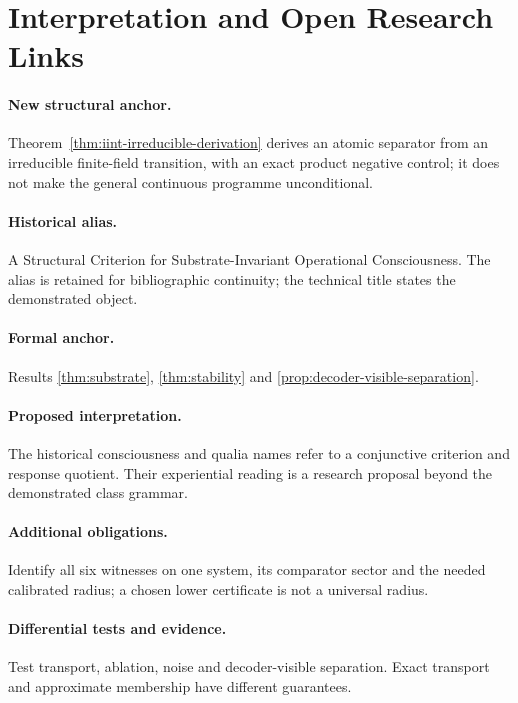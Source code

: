 \documentclass[11pt,a4paper]{article}
\theoremstyle{definition}
\begin{document}
\section{Interpretation and Open Research Links}\label{sec:interpretation-open-links}
\paragraph{New structural anchor.} Theorem~\ref{thm:iint-irreducible-derivation} derives an atomic separator from an irreducible finite-field transition, with an exact product negative control; it does not make the general continuous programme unconditional.

\paragraph{Historical alias.} A Structural Criterion for Substrate-Invariant Operational Consciousness. The alias is retained for bibliographic continuity; the technical title states the demonstrated object.

\paragraph{Formal anchor.} Results \ref{thm:substrate}, \ref{thm:stability} and \ref{prop:decoder-visible-separation}.

\paragraph{Proposed interpretation.} The historical consciousness and qualia names refer to a conjunctive criterion and response quotient. Their experiential reading is a research proposal beyond the demonstrated class grammar.

\paragraph{Additional obligations.} Identify all six witnesses on one system, its comparator sector and the needed calibrated radius; a chosen lower certificate is not a universal radius.

\paragraph{Differential tests and evidence.} Test transport, ablation, noise and decoder-visible separation. Exact transport and approximate membership have different guarantees.
\end{document}
